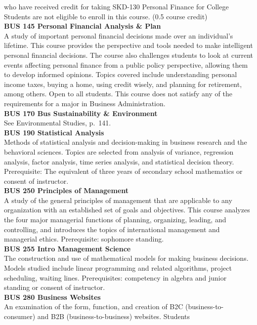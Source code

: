 \documentclass[
  letterpaper,
]{scrbook}
\begin{document}
who have received credit for taking SKD-130 Personal Finance for College
Students are not eligible to enroll in this course. (0.5 course
credit)\\
\textbf{BUS 145 Personal Financial Analysis \& Plan}\\
A study of important personal financial decisions made over an
individual's lifetime. This course provides the perspective and tools
needed to make intelligent personal financial decisions. The course also
challenges students to look at current events affecting personal finance
from a public policy perspective, allowing them to develop informed
opinions. Topics covered include understanding personal income taxes,
buying a home, using credit wisely, and planning for retirement, among
others. Open to all students. This course does not satisfy any of the
requirements for a major in Business Administration.\\
\textbf{BUS 170 Bus Sustainability \& Environment}\\
See Environmental Studies, p.~141.\\
\textbf{BUS 190 Statistical Analysis}\\
Methods of statistical analysis and decision-making in business research
and the behavioral sciences. Topics are selected from analysis of
variance, regression analysis, factor analysis, time series analysis,
and statistical decision theory. Prerequisite: The equivalent of three
years of secondary school mathematics or consent of instructor.\\
\textbf{BUS 250 Principles of Management}\\
A study of the general principles of management that are applicable to
any organization with an established set of goals and objectives. This
course analyzes the four major managerial functions of planning,
organizing, leading, and controlling, and introduces the topics of
international management and managerial ethics. Prerequisite: sophomore
standing.\\
\textbf{BUS 255 Intro Management Science}\\
The construction and use of mathematical models for making business
decisions. Models studied include linear programming and related
algorithms, project scheduling, waiting lines. Prerequisites: competency
in algebra and junior standing or consent of instructor.\\
\textbf{BUS 280 Business Websites}\\
An examination of the form, function, and creation of B2C
(business-to-consumer) and B2B (business-to-business) websites. Students
\end{document}
